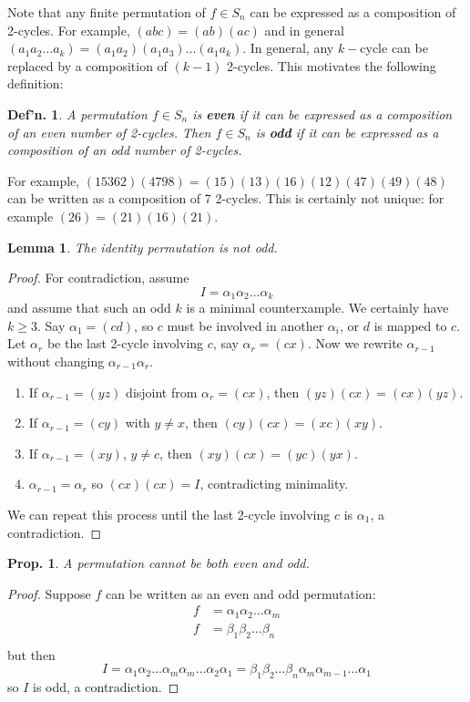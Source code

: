 \documentclass[12pt, a4paper]{book}
\newtheorem{lemma}[theorem]{Lemma}
\newtheorem{definition}[theorem]{Def'n.}
\newtheorem{proposition}[theorem]{Prop.}
\theoremstyle{nonumberplain}
\newtheorem{proof}{Proof}
\begin{document}
Note that any finite permutation of $f\in S_n$ can be expressed as a composition of 2-cycles.
For example, $(abc)=(ab)(ac)$ and in general $(a_1a_2\ldots a_k)=(a_1a_2)(a_1a_3)\ldots(a_1a_k)$.
In general, any $k-$cycle can be replaced by a composition of $(k-1)$ 2-cycles.
This motivates the following definition:
\begin{definition}
    A permutation $f\in S_n$ is \textbf{even} if it can be expressed as a composition of an even number of 2-cycles.
    Then $f\in S_n$ is \textbf{odd} if it can be expressed as a composition of an odd number of 2-cycles.
\end{definition}
For example, $(15362)(4798)=(15)(13)(16)(12)(47)(49)(48)$ can be written as a composition of 7 2-cycles.
This is certainly not unique: for example $(26)=(21)(16)(21)$.
\begin{lemma}
    The identity permutation is not odd.
\end{lemma}
\begin{proof}
    For contradiction, assume
    \[I=\alpha_1\alpha_2\ldots\alpha_{k}\]
    and assume that such an odd $k$ is a minimal counterxample.
    We certainly have $k\geq 3$.
    Say $\alpha_1=(cd)$, so $c$ must be involved in another $\alpha_i$, or $d$ is mapped to $c$.
    Let $\alpha_r$ be the last 2-cycle involving $c$, say $\alpha_r=(cx)$.
    Now we rewrite $\alpha_{r-1}$ without changing $\alpha_{r-1}\alpha_r$.
    \begin{enumerate}[nolistsep]
        \item If $\alpha_{r-1}=(yz)$ disjoint from $\alpha_r=(cx)$, then $(yz)(cx)=(cx)(yz)$.
        \item If $\alpha_{r-1}=(cy)$ with $y\neq x$, then $(cy)(cx)=(xc)(xy)$.
        \item If $\alpha_{r-1}=(xy)$, $y\neq c$, then $(xy)(cx)=(yc)(yx)$.
        \item $\alpha_{r-1}=\alpha_r$ so $(cx)(cx)=I$, contradicting minimality.
    \end{enumerate}
    We can repeat this process until the last 2-cycle involving $c$ is $\alpha_1$, a contradiction.
\end{proof}
\begin{proposition}
    A permutation cannot be both even and odd.
\end{proposition}
\begin{proof}
    Suppose $f$ can be written as an even and odd permutation:
    \begin{align*}
        f &= \alpha_1\alpha_2\ldots\alpha_m\\
        f &= \beta_1\beta_2\ldots\beta_n\\
    \end{align*}
    but then
    \[I=\alpha_1\alpha_2\ldots\alpha_m\alpha_m\ldots\alpha_2\alpha_1=\beta_1\beta_2\ldots\beta_n\alpha_m\alpha_{m-1}\ldots\alpha_1\]
    so $I$ is odd, a contradiction.
\end{proof}
\end{document}
